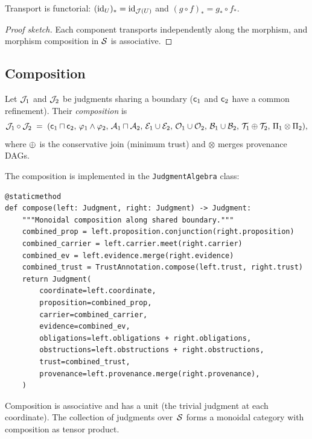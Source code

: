 \documentclass[11pt]{article}
\begin{document}
\begin{proposition}\label{prop:transport-func}
Transport is functorial:
$(\mathrm{id}_U)_* = \mathrm{id}_{\mathcal{J}(U)}$ and
$(g \circ f)_* = g_* \circ f_*$.
\end{proposition}

\begin{proof}[Proof sketch]
Each component transports independently along the morphism, and
morphism composition in $\mathcal{S}$ is associative.
\end{proof}

\subsection{Composition}\label{ssec:composition}

\begin{definition}[Composition]
Let $\mathcal{J}_1$ and $\mathcal{J}_2$ be judgments sharing a boundary
($\mathsf{c}_1$ and $\mathsf{c}_2$ have a common refinement).  Their
\emph{composition} is
\[
  \mathcal{J}_1 \circ \mathcal{J}_2 \;=\;
  (\mathsf{c}_1 \sqcap \mathsf{c}_2,\,\varphi_1 \wedge \varphi_2,\,\mathcal{A}_1 \sqcap \mathcal{A}_2,\,\mathcal{E}_1 \cup \mathcal{E}_2,\,\mathcal{O}_1 \cup \mathcal{O}_2,\,\mathcal{B}_1 \cup \mathcal{B}_2,\,\mathcal{T}_1 \oplus \mathcal{T}_2,\,\Pi_1 \otimes \Pi_2),
\]
where $\oplus$ is the conservative join (minimum trust) and $\otimes$
merges provenance DAGs.
\end{definition}

The composition is implemented in the \texttt{JudgmentAlgebra} class:

\begin{lstlisting}[caption={Composition in \texttt{JudgmentAlgebra}.}]
@staticmethod
def compose(left: Judgment, right: Judgment) -> Judgment:
    """Monoidal composition along shared boundary."""
    combined_prop = left.proposition.conjunction(right.proposition)
    combined_carrier = left.carrier.meet(right.carrier)
    combined_ev = left.evidence.merge(right.evidence)
    combined_trust = TrustAnnotation.compose(left.trust, right.trust)
    return Judgment(
        coordinate=left.coordinate,
        proposition=combined_prop,
        carrier=combined_carrier,
        evidence=combined_ev,
        obligations=left.obligations + right.obligations,
        obstructions=left.obstructions + right.obstructions,
        trust=combined_trust,
        provenance=left.provenance.merge(right.provenance),
    )
\end{lstlisting}

\begin{proposition}\label{prop:monoidal}
Composition is associative and has a unit (the trivial judgment at
each coordinate).  The collection of judgments over~$\mathcal{S}$ forms a
monoidal category with composition as tensor product.
\end{proposition}
\end{document}
